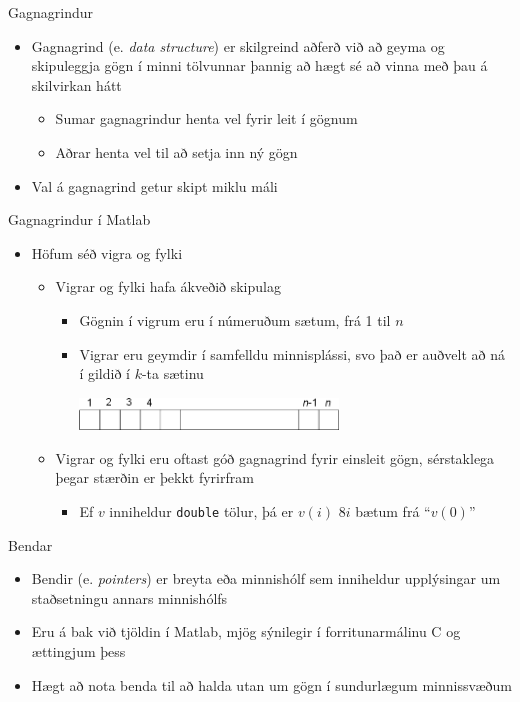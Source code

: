 \documentclass{beamer}
\begin{document}
\begin{frame}{Gagnagrindur}
\begin{itemize}
 \item Gagnagrind (e. \emph{data structure}) er skilgreind aðferð við að geyma og skipuleggja gögn í minni tölvunnar þannig að hægt sé að vinna með þau á skilvirkan hátt
 \begin{itemize}
  \item Sumar gagnagrindur henta vel fyrir leit í gögnum
  \item Aðrar henta vel til að setja inn ný gögn
 \end{itemize}
 \item Val á gagnagrind getur skipt miklu máli
\end{itemize}
\end{frame}

\begin{frame}{Gagnagrindur í Matlab}
\begin{itemize}
 \item Höfum séð vigra og fylki
 \begin{itemize}
  \item Vigrar og fylki hafa ákveðið skipulag
  \begin{itemize}
   \item Gögnin í vigrum eru í númeruðum sætum, frá 1 til $n$
   \item Vigrar eru geymdir í samfelldu minnisplássi, svo það er auðvelt að ná í gildið í $k$-ta sætinu
\begin{center}
\includegraphics[width=0.6\textwidth]{Pics/vector-index}
\end{center}
   \end{itemize}
  \item Vigrar og fylki eru oftast góð gagnagrind fyrir einsleit gögn, sérstaklega þegar stærðin er þekkt fyrirfram
  \begin{itemize}
   \item Ef $v$ inniheldur \texttt{double} tölur, þá er $v(i)$ $8i$ bætum frá ``$v(0)$''
  \end{itemize}
 \end{itemize}
\end{itemize}
\end{frame}

\begin{frame}{Bendar}
    \begin{itemize}
        \item Bendir (e. \emph{pointers}) er breyta eða minnishólf sem inniheldur upplýsingar um staðsetningu annars minnishólfs
        \item Eru á bak við tjöldin í Matlab, mjög sýnilegir í forritunarmálinu C og ættingjum þess
        \item Hægt að nota benda til að halda utan um gögn í sundurlægum minnissvæðum
    \end{itemize}
\end{frame}
\end{document}
